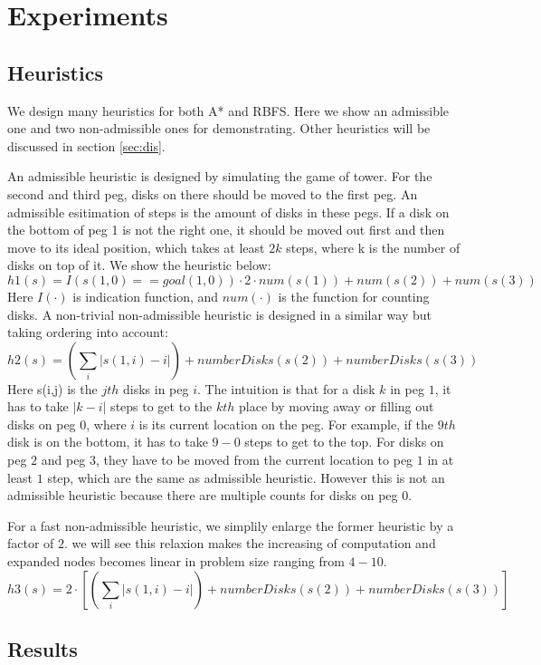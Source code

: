 \section{Experiments}\label{sec:exp}

\subsection{Heuristics}
We design many heuristics for both A* and RBFS. Here we show an admissible one and two non-admissible ones for demonstrating. Other heuristics will be discussed in section \ref{sec:dis}.

An admissible heuristic is designed by simulating the game of tower. For the second and third peg, disks on there should be moved to the first peg. An admissible esitimation of steps is the amount of disks in these pegs. If a disk on the bottom of peg 1 is not the right one, it should be moved out first and then move to its ideal position, which takes at least $2k$ steps, where k is the number of disks on top of it. We show the heuristic below:
\[
h1(s) = I(s(1,0)==goal(1,0))\cdot 2 \cdot num(s(1)) + num(s(2)) + num(s(3))
\]
Here $I(\cdot)$ is indication function, and $num(\cdot)$ is the function for counting disks. A non-trivial non-admissible heuristic is designed in a similar way but taking ordering into account:
\[
h2(s) = (\sum_i |s(1,i)-i| ) + numberDisks(s(2)) + numberDisks(s(3))
\]
Here s(i,j) is the $jth$ disks in peg $i$. The intuition is that for a disk $k$ in peg $1$, it has to take $|k-i|$ steps to get to the $kth$ place by moving away or filling out disks on peg $0$, where $i$ is its current location on the peg. For example, if the $9th$ disk is on the bottom, it has to take $9-0$ steps to get to the top. For disks on peg $2$ and peg $3$, they have to be moved from the current location to peg $1$ in at least $1$ step, which are the same as admissible
heuristic. However this is not an admissible heuristic because there are multiple counts for disks on peg $0$. 

For a fast non-admissible heuristic, we simplily enlarge the former heuristic by a factor of $2$. we will see this relaxion makes the increasing of computation and expanded nodes becomes linear in problem size ranging from $4-10$.
\[
h3(s) = 2 \cdot [(\sum_i |s(1,i)-i| ) + numberDisks(s(2)) + numberDisks(s(3))]
\]
\subsection{Results}

